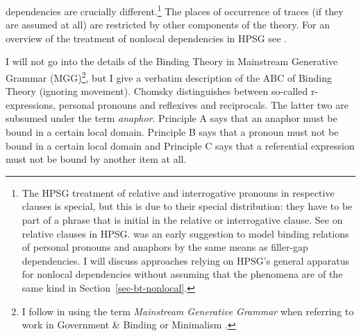 \documentclass[output=paper,biblatex,babelshorthands,newtxmath,draftmode,colorlinks,citecolor=brown]{langscibook}
\begin{document}
dependencies are crucially different.\footnote{\label{binding-fn-percolation-of-indices}%
The HPSG treatment of relative and interrogative pronouns in respective clauses is special, but this
is due to their special distribution: they have to be part of a phrase that is initial in the
relative or interrogative clause. 
See  on relative
clauses in HPSG. %
 was an early suggestion to model binding relations of personal pronouns and anaphors by
the same means as filler-gap dependencies. I will discuss approaches relying on HPSG's general apparatus
for nonlocal dependencies without assuming that the phenomena are of the same kind in Section~\ref{sec-bt-nonlocal}. 
} The places of occurrence of traces (if they are assumed at all)
are restricted by other components of the theory. For an overview of the treatment of nonlocal
dependencies in HPSG see .

I will not go into the details of the Binding Theory in Mainstream Generative Grammar
(MGG)\footnote{
I follow \citet[]{CJ2005a} in using the term \emph{Mainstream Generative Grammar} when
referring to work in Government \& Binding\indexgb \citep{Chomsky81a} or Minimalism \citep{Chomsky95a-u}.}, but I
give a verbatim description of the ABC of Binding Theory (ignoring movement). Chomsky distinguishes between
so-called r-expressions, personal
pronouns and reflexives and reciprocals. The latter two are subsumed under the term \emph{anaphor}. 
Principle A says that an anaphor must be bound in a certain local domain. Principle B says that a
pronoun must not be bound in a certain local domain and Principle C says that a referential
expression must not be bound by another item at all.
\end{document}
